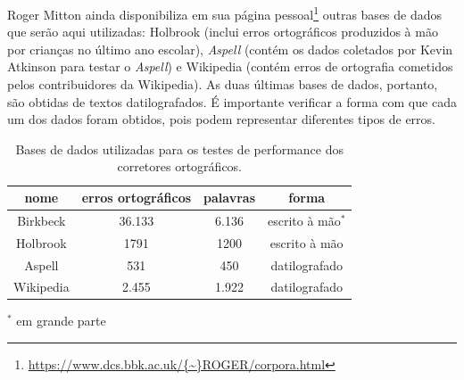\documentclass{textolivre}
\begin{document}

Roger Mitton ainda disponibiliza em sua página pessoal\footnote{\url{https://www.dcs.bbk.ac.uk/{\~}ROGER/corpora.html}} outras bases
de dados que serão aqui utilizadas: Holbrook (inclui erros ortográficos produzidos à mão por crianças no último ano escolar),
\textit{Aspell} (contém os dados coletados por Kevin Atkinson para testar o \textit{Aspell}) e Wikipedia (contém erros de ortografia cometidos
pelos contribuidores da Wikipedia). As duas últimas bases de dados, portanto, são obtidas de textos datilografados.
É importante verificar a forma com que
cada um dos dados foram obtidos, pois podem representar diferentes tipos de
erros.

\begin{table}[htbp]
\centering
\caption{Bases de dados utilizadas para os testes de performance dos corretores ortográficos.}\label{tab-data}
\begin{tabular}{cccc}
\toprule
  nome      & erros ortográficos    & palavras  & forma   \\
\midrule  
  Birkbeck  & 36.133                & 6.136     & escrito à mão$^{*}$\\
\midrule
  Holbrook  & 1791                  & 1200      & escrito à mão \\
\midrule
  Aspell    & 531                   & 450       & datilografado \\
\midrule
  Wikipedia & 2.455                 & 1.922     & datilografado \\
\bottomrule
\end{tabular}
    \vspace{1ex}

    { \hspace{18em} \footnotesize $^{*}$ em grande parte \par}

\end{table}
\end{document}
